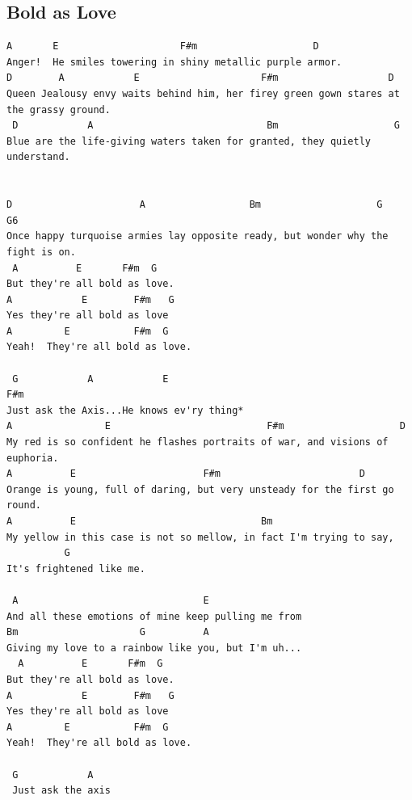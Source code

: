 \documentclass[a4paper]{article}
\begin{document}
\subsection{Bold as Love} %
\label{sub:Bold as Love}
\begin{Verbatim}[commandchars=\\\{\}]
	  A       E                     F#m                    D                    
Anger!  He smiles towering in shiny metallic purple armor.   
D        A            E                     F#m                   D 
Queen Jealousy envy waits behind him, her firey green gown stares at the grassy ground.   
 D            A                              Bm                    G            
Blue are the life-giving waters taken for granted, they quietly understand. 


D                      A                  Bm                    G    G6    
Once happy turquoise armies lay opposite ready, but wonder why the fight is on. 
 A          E       F#m  G    
But they're all bold as love. 
A            E        F#m   G        
Yes they're all bold as love 
A         E           F#m  G  
Yeah!  They're all bold as love. 
  
 G            A            E                                          F#m 
Just ask the Axis...He knows ev'ry thing* 
A                E                           F#m                    D                    
My red is so confident he flashes portraits of war, and visions of euphoria.   
A          E                      F#m                        D                    
Orange is young, full of daring, but very unsteady for the first go round. 
A          E                                Bm      
My yellow in this case is not so mellow, in fact I'm trying to say,  
          G 
It's frightened like me. 

 A                                E                         
And all these emotions of mine keep pulling me from  
Bm                     G          A 
Giving my love to a rainbow like you, but I'm uh... 
  A          E       F#m  G    
But they're all bold as love. 
A            E        F#m   G        
Yes they're all bold as love 
A         E           F#m  G  
Yeah!  They're all bold as love. 

 G            A   
 Just ask the axis
 \end{Verbatim}
 \newpage
\end{document}
